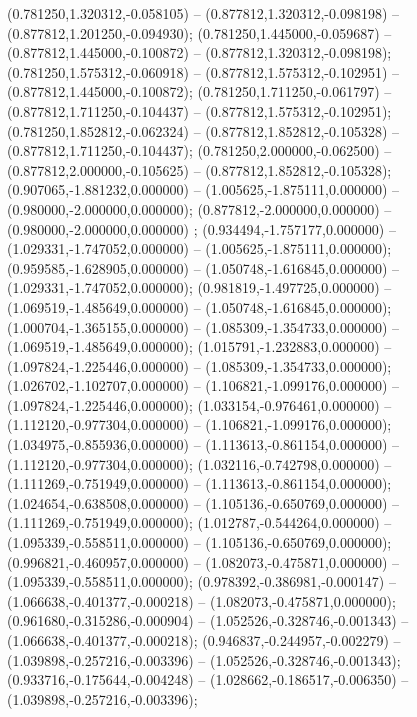  (0.781250,1.320312,-0.058105) -- (0.877812,1.320312,-0.098198) -- (0.877812,1.201250,-0.094930);
 (0.781250,1.445000,-0.059687) -- (0.877812,1.445000,-0.100872) -- (0.877812,1.320312,-0.098198);
 (0.781250,1.575312,-0.060918) -- (0.877812,1.575312,-0.102951) -- (0.877812,1.445000,-0.100872);
 (0.781250,1.711250,-0.061797) -- (0.877812,1.711250,-0.104437) -- (0.877812,1.575312,-0.102951);
 (0.781250,1.852812,-0.062324) -- (0.877812,1.852812,-0.105328) -- (0.877812,1.711250,-0.104437);
 (0.781250,2.000000,-0.062500) -- (0.877812,2.000000,-0.105625) -- (0.877812,1.852812,-0.105328);
 (0.907065,-1.881232,0.000000) -- (1.005625,-1.875111,0.000000) -- (0.980000,-2.000000,0.000000);
 (0.877812,-2.000000,0.000000) -- (0.980000,-2.000000,0.000000) ;
 (0.934494,-1.757177,0.000000) -- (1.029331,-1.747052,0.000000) -- (1.005625,-1.875111,0.000000);
 (0.959585,-1.628905,0.000000) -- (1.050748,-1.616845,0.000000) -- (1.029331,-1.747052,0.000000);
 (0.981819,-1.497725,0.000000) -- (1.069519,-1.485649,0.000000) -- (1.050748,-1.616845,0.000000);
 (1.000704,-1.365155,0.000000) -- (1.085309,-1.354733,0.000000) -- (1.069519,-1.485649,0.000000);
 (1.015791,-1.232883,0.000000) -- (1.097824,-1.225446,0.000000) -- (1.085309,-1.354733,0.000000);
 (1.026702,-1.102707,0.000000) -- (1.106821,-1.099176,0.000000) -- (1.097824,-1.225446,0.000000);
 (1.033154,-0.976461,0.000000) -- (1.112120,-0.977304,0.000000) -- (1.106821,-1.099176,0.000000);
 (1.034975,-0.855936,0.000000) -- (1.113613,-0.861154,0.000000) -- (1.112120,-0.977304,0.000000);
 (1.032116,-0.742798,0.000000) -- (1.111269,-0.751949,0.000000) -- (1.113613,-0.861154,0.000000);
 (1.024654,-0.638508,0.000000) -- (1.105136,-0.650769,0.000000) -- (1.111269,-0.751949,0.000000);
 (1.012787,-0.544264,0.000000) -- (1.095339,-0.558511,0.000000) -- (1.105136,-0.650769,0.000000);
 (0.996821,-0.460957,0.000000) -- (1.082073,-0.475871,0.000000) -- (1.095339,-0.558511,0.000000);
 (0.978392,-0.386981,-0.000147) -- (1.066638,-0.401377,-0.000218) -- (1.082073,-0.475871,0.000000);
 (0.961680,-0.315286,-0.000904) -- (1.052526,-0.328746,-0.001343) -- (1.066638,-0.401377,-0.000218);
 (0.946837,-0.244957,-0.002279) -- (1.039898,-0.257216,-0.003396) -- (1.052526,-0.328746,-0.001343);
 (0.933716,-0.175644,-0.004248) -- (1.028662,-0.186517,-0.006350) -- (1.039898,-0.257216,-0.003396);
